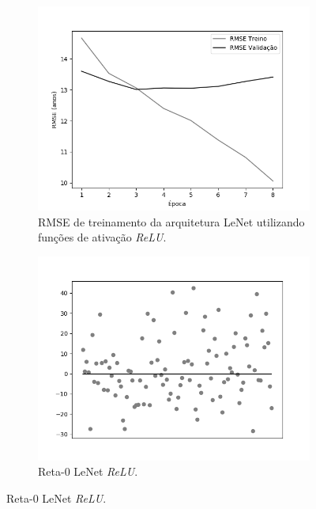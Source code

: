 	\begin{figure}[hb!]
		\caption{Resultados do treinamento e teste da CNN LeNet.}\label{fig:lenet-abordagem1}
	  \begin{subfigure}[hb]{0.5\linewidth}
	    \caption{RMSE de treinamento da arquitetura LeNet utilizando funções de ativação \emph{ReLU}.}
	    \label{fig:redeneuralbiologica}
	    \includegraphics[width=\linewidth]{img/graficos/history/lenet/fig-history-image-treat-1-lenet-relu-rmse.png}%
	  \end{subfigure}%
		\begin{subfigure}[hb]{0.5\linewidth}
			\caption{Reta-0 LeNet \emph{ReLU}.}
			\label{fig:redeneuralbiologica}
			\includegraphics[width=\linewidth]{img/graficos/reta0/lenet/fig-reta-0-image-treat-1-lenet-relu.png}%

\end{subfigure}
\end{figure}
